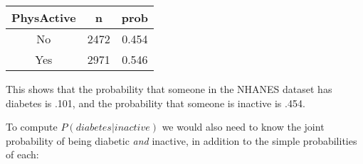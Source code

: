 \documentclass[]{book}
\newenvironment{Shaded}{\begin{snugshade}}{\end{snugshade}}
\newcommand{\KeywordTok}[1]{\textcolor[rgb]{0.13,0.29,0.53}{\textbf{#1}}}
\newcommand{\DataTypeTok}[1]{\textcolor[rgb]{0.13,0.29,0.53}{#1}}
\newcommand{\StringTok}[1]{\textcolor[rgb]{0.31,0.60,0.02}{#1}}
\newcommand{\CommentTok}[1]{\textcolor[rgb]{0.56,0.35,0.01}{\textit{#1}}}
\newcommand{\OperatorTok}[1]{\textcolor[rgb]{0.81,0.36,0.00}{\textbf{#1}}}
\newcommand{\NormalTok}[1]{#1}
\theoremstyle{definition}
\theoremstyle{definition}
\theoremstyle{definition}
\theoremstyle{remark}
\begin{document}
\begin{longtable}[]{@{}ccc@{}}
\toprule
\begin{minipage}[b]{0.16\columnwidth}\centering\strut
PhysActive\strut
\end{minipage} & \begin{minipage}[b]{0.09\columnwidth}\centering\strut
n\strut
\end{minipage} & \begin{minipage}[b]{0.09\columnwidth}\centering\strut
prob\strut
\end{minipage}\tabularnewline
\midrule
\endhead
\begin{minipage}[t]{0.16\columnwidth}\centering\strut
No\strut
\end{minipage} & \begin{minipage}[t]{0.09\columnwidth}\centering\strut
2472\strut
\end{minipage} & \begin{minipage}[t]{0.09\columnwidth}\centering\strut
0.454\strut
\end{minipage}\tabularnewline
\begin{minipage}[t]{0.16\columnwidth}\centering\strut
Yes\strut
\end{minipage} & \begin{minipage}[t]{0.09\columnwidth}\centering\strut
2971\strut
\end{minipage} & \begin{minipage}[t]{0.09\columnwidth}\centering\strut
0.546\strut
\end{minipage}\tabularnewline
\bottomrule
\end{longtable}

This shows that the probability that someone in the NHANES dataset has
diabetes is .101, and the probability that someone is inactive is .454.

To compute \(P(diabetes|inactive)\) we would also need to know the joint
probability of being diabetic \emph{and} inactive, in addition to the
simple probabilities of each:

\begin{Shaded}
\end{Shaded}
\end{document}

